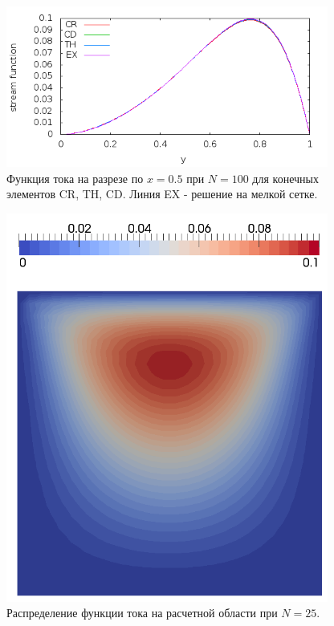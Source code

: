 \documentclass[12pt]{article}
\begin{document}
\begin{figure}
	\begin{center}
		\includegraphics[width=400px]{pics/psi_100}
		\caption{Функция тока на разрезе по $x=0.5$ при $N=100$ для конечных элементов CR, TH, CD. Линия EX - решение на мелкой сетке.}
		\label{fg:psi_100}
	\end{center}
\end{figure}

\begin{figure}
	\begin{center}
		\includegraphics[width=400px]{pics/pvd_psi_25}
		\caption{Распределение функции тока на расчетной области при $N=25$.}
		\label{fg:pvd_psi_25}
	\end{center}
\end{figure}
\end{document}
